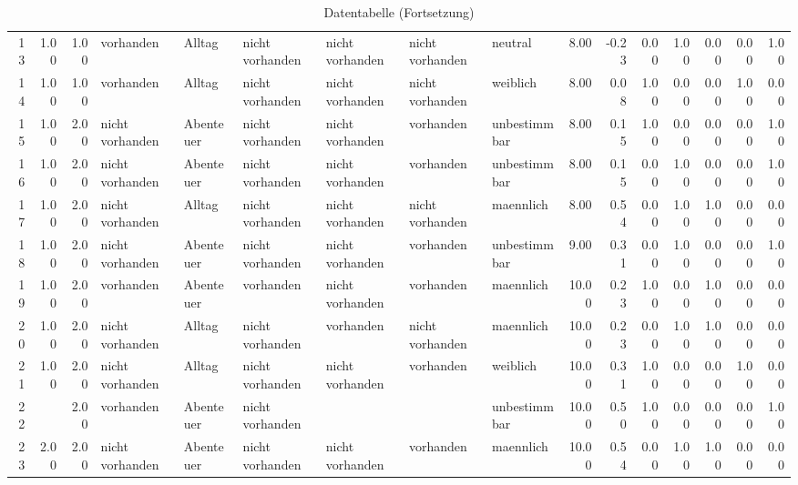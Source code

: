 \begin{table}
\begin{center}
{\begin{tabular}{rrrllllllrrrrrrr}
  13 & 1.00 & 1.00 & vorhanden & Alltag & nicht vorhanden & nicht vorhanden & nicht vorhanden & neutral & 8.00 & -0.23 & 0.00 & 1.00 & 0.00 & 0.00 & 1.00 \\ 
  14 & 1.00 & 1.00 & vorhanden & Alltag & nicht vorhanden & nicht vorhanden & nicht vorhanden & weiblich & 8.00 & 0.08 & 1.00 & 0.00 & 0.00 & 1.00 & 0.00 \\ 
  15 & 1.00 & 2.00 & nicht vorhanden & Abenteuer & nicht vorhanden & nicht vorhanden & vorhanden & unbestimmbar & 8.00 & 0.15 & 1.00 & 0.00 & 0.00 & 0.00 & 1.00 \\ 
  16 & 1.00 & 2.00 & nicht vorhanden & Abenteuer & nicht vorhanden & nicht vorhanden & vorhanden & unbestimmbar & 8.00 & 0.15 & 0.00 & 1.00 & 0.00 & 0.00 & 1.00 \\ 
  17 & 1.00 & 2.00 & nicht vorhanden & Alltag & nicht vorhanden & nicht vorhanden & nicht vorhanden & maennlich & 8.00 & 0.54 & 0.00 & 1.00 & 1.00 & 0.00 & 0.00 \\ 
  18 & 1.00 & 2.00 & nicht vorhanden & Abenteuer & nicht vorhanden & nicht vorhanden & vorhanden & unbestimmbar & 9.00 & 0.31 & 0.00 & 1.00 & 0.00 & 0.00 & 1.00 \\ 
  19 & 1.00 & 2.00 & vorhanden & Abenteuer & vorhanden & nicht vorhanden & vorhanden & maennlich & 10.00 & 0.23 & 1.00 & 0.00 & 1.00 & 0.00 & 0.00 \\ 
  20 & 1.00 & 2.00 & nicht vorhanden & Alltag & nicht vorhanden & vorhanden & nicht vorhanden & maennlich & 10.00 & 0.23 & 0.00 & 1.00 & 1.00 & 0.00 & 0.00 \\ 
  21 & 1.00 & 2.00 & nicht vorhanden & Alltag & nicht vorhanden & nicht vorhanden & vorhanden & weiblich & 10.00 & 0.31 & 1.00 & 0.00 & 0.00 & 1.00 & 0.00 \\ 
  22 &  & 2.00 & vorhanden & Abenteuer & nicht vorhanden &  &  & unbestimmbar & 10.00 & 0.50 & 1.00 & 0.00 & 0.00 & 0.00 & 1.00 \\ 
  23 & 2.00 & 2.00 & nicht vorhanden & Abenteuer & nicht vorhanden & nicht vorhanden & vorhanden & maennlich & 10.00 & 0.54 & 0.00 & 1.00 & 1.00 & 0.00 & 0.00 \\ 
   \hline
\end{tabular}
}
\caption{Datentabelle (Fortsetzung)}
\label{merkmale}
\end{center}
\end{table}













